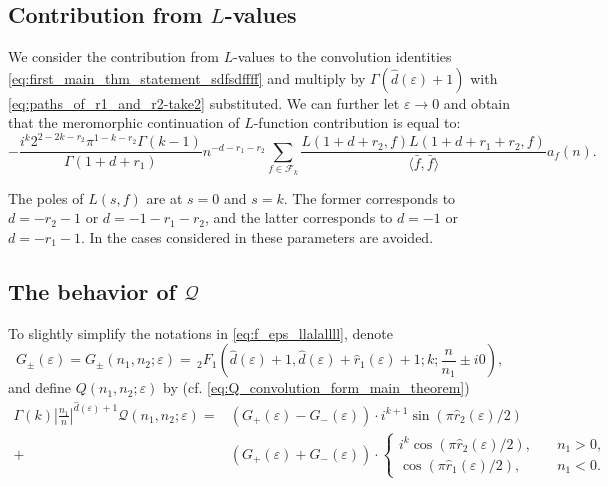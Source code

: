 \documentclass[]{article}
\begin{document}
\subsection{Contribution from $L$-values}\label{sec:regL-val}
We consider the contribution from $L$-values to the convolution identities \eqref{eq:first_main_thm_statement_sdfsdffff} and multiply by $\Gamma(\hat d(\varepsilon)+1)$ with \eqref{eq:paths_of_r1_and_r2-take2} substituted. We can further let  $\varepsilon \to 0$  
and obtain that the meromorphic continuation of $L$-function contribution is equal to:
\begin{equation}
-\frac{i^k 2^{2 - 2 k - r_2} \pi ^{1-k-r_2} \Gamma (k-1) }{\Gamma \left(1+d+r_1\right)} n^{-d-r_1-r_2} \sum_{f \in \mathcal{F}_k} \frac{L\left(1 + d + r_2,f\right) L\left(1 + d + r_1 + r_2,f\right)}{\langle \bar f, \bar f \rangle }   a_f(n).
\end{equation}

  The poles of $L(s, f)$ are at $s=0$ and $s=k$. The former corresponds to $d=-r_2-1$ or $d=-1-r_1-r_2$, and the latter corresponds to $d=-1$ or $d=-r_1-1$.  In the cases considered in \cite{DKS2021_2} these parameters are avoided. 


\subsection{The behavior of $\mathcal{Q}$}
To slightly simplify the notations in \eqref{eq:f_eps_llalallll}, denote 
\begin{equation}
G_{\pm}(\varepsilon) = G_{\pm}(n_1, n_2; \varepsilon) = \, _2 F_1 \left(\hat d(\varepsilon)+1,\hat d(\varepsilon)+\hat r_1(\varepsilon)+1;k;\frac{n}{n_1} \pm  i 0\right),
\end{equation} 
and define  $Q(n_1, n_2; \varepsilon)$  by (cf. \eqref{eq:Q_convolution_form_main_theorem})
    \begin{equation}\label{eq:Q_convolution_form-take2}
    \begin{split}
    \Gamma(k) \left|\frac{n_1}{n}\right|^{\hat d(\varepsilon)+1}  \mathcal{Q}(n_1,n_2; \varepsilon) = & \left(  G_+(\varepsilon)  - G_-(\varepsilon)  \right) \cdot  i^{k+1} \sin( \pi \hat r_2(\varepsilon) / 2) \\
    + & \left(  G_+(\varepsilon)  + G_-(\varepsilon) \right) \cdot \begin{cases}
       i^{k}  \cos(\pi \hat r_2(\varepsilon) / 2), \quad &n_1 > 0, \\
             \cos(\pi \hat r_1(\varepsilon) / 2), \quad &n_1 < 0. 
        \end{cases}
    \end{split}
\end{equation}
\end{document}
